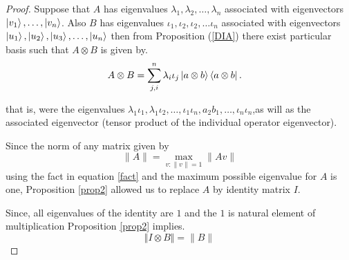 \begin{proof}
Suppose that $A$ has eigenvalues $\lambda_1,\lambda_2,\dots ,\lambda_n$  associated with eigenvectors $\ket{v_1},\dots,\ket{v_n}$.
Also $B$ has eigenvalues $\iota_1,\iota_2,\iota_2,\dots \iota_n$ associated with eigenvectors $\ket{u_1},\ket{u_2},\ket{u_3}, \dots ,\ket{u_n}$ then from Proposition (\ref{DIA}) there exist particular basis such that  $A\otimes B$ is given by.
\begin{align}
 A\otimes B&=\sum_{j,i}^n  \lambda_i \iota_j \ket{a\otimes b}\bra{a \otimes b}.
\end{align}

that is, were the eigenvalues $\lambda_1 \iota_1,\lambda_1 \iota_2,\ldots,\iota_1 \iota_n,a_2b_1,\dots ,\iota_n \iota_n$,as will as  the associated  eigenvector  (tensor product of the individual operator eigenvector).

Since the norm of any matrix given by
\begin{equation}
\| A \|=\max_{v: \| v\|=1}\| A v\|\label{fact}
\end{equation}
using the fact in equation \ref {fact} and the maximum possible eigenvalue for $A$ is one, Proposition \ref{prop2} allowed us to replace $A$ by identity matrix $I$.

Since, all  eigenvalues of the identity are $1$ and the $1$ is natural element of multiplication Proposition \ref{prop2} implies.
\begin{equation}
\Vert I\otimes B \Vert=\|B\|
\end{equation}
\end{proof}


